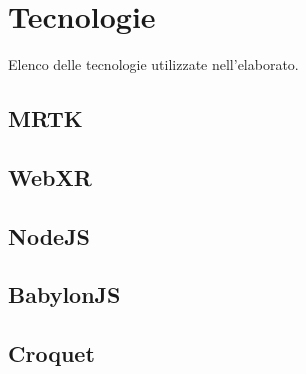 \chapter{Tecnologie}\label{chap:Tecnologie}
Elenco delle tecnologie utilizzate nell'elaborato.
\section{MRTK}\label{sec:MRTK}
\section{WebXR}\label{sec:WebXR}
\section{NodeJS}\label{sec:NodeJS}
\section{BabylonJS}\label{sec:BabylonJS}
\section{Croquet}\label{sec:Croquet}